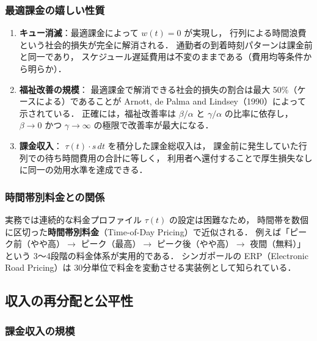 \subsubsection*{最適課金の嬉しい性質}

\begin{enumerate}
  \item
    \textbf{キュー消滅}：最適課金によって $w(t)=0$ が実現し，
    行列による時間浪費という社会的損失が完全に解消される．
    通勤者の到着時刻パターンは課金前と同一であり，
    スケジュール遅延費用は不変のままである（費用均等条件から明らか）．

  \item
    \textbf{福祉改善の規模}：
    最適課金で解消できる社会的損失の割合は最大 50\%（ケースによる）であることが
    Arnott, de Palma and Lindsey（1990）によって示されている\cite{ArnottdePalmaLindsey1990}．
    正確には，福祉改善率は $\beta/\alpha$ と $\gamma/\alpha$ の比率に依存し，
    $\beta \to 0$ かつ $\gamma \to \infty$ の極限で改善率が最大になる．

  \item
    \textbf{課金収入}：
    $\tau(t) \cdot s\,dt$ を積分した課金総収入は，
    課金前に発生していた行列での待ち時間費用の合計に等しく，
    利用者へ還付することで厚生損失なしに同一の効用水準を達成できる．
\end{enumerate}

\subsubsection*{時間帯別料金との関係}

実務では連続的な料金プロファイル $\tau(t)$ の設定は困難なため，
時間帯を数個に区切った\textbf{時間帯別料金}（Time-of-Day Pricing）で近似される．
例えば「ピーク前（やや高）$\rightarrow$ ピーク（最高）$\rightarrow$ ピーク後（やや高）$\rightarrow$ 夜間（無料）」という
3〜4段階の料金体系が実用的である．
シンガポールの ERP（Electronic Road Pricing）は
30分単位で料金を変動させる実装例として知られている．

\subsection{収入の再分配と公平性}
\label{subsec:redistribution}

\subsubsection*{課金収入の規模}

